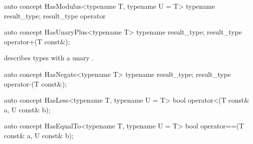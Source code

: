 \documentclass[american,twoside]{book}
\begin{document}
\begin{itemdescr}
\pnum
{}
\end{itemdescr}

\begin{itemdecl}
auto concept HasModulus<typename T, typename U = T> {
  typename result_type;
  result_type operator%
}
\end{itemdecl}

\begin{itemdescr}
\pnum
{}
\end{itemdescr}

\begin{itemdecl}
auto concept HasUnaryPlus<typename T> {
  typename result_type;
  result_type operator+(T const&);
}
\end{itemdecl}

\begin{itemdescr}
\pnum
\mbox{\reallynote} describes types with a unary \mbox{}.
\end{itemdescr}

\begin{itemdecl}
auto concept HasNegate<typename T> {
  typename result_type;
  result_type operator-(T const&);
}
\end{itemdecl}

\begin{itemdescr}
\pnum
{}
\end{itemdescr}

\begin{itemdecl}
auto concept HasLess<typename T, typename U = T> {
  bool operator<(T const& a, U const& b);
}
\end{itemdecl}

\begin{itemdescr}
\pnum
{}
\end{itemdescr}

\begin{itemdecl}
auto concept HasEqualTo<typename T, typename U = T> {
  bool operator==(T const& a, U const& b);
}
\end{itemdecl}

\begin{itemdescr}
\pnum
{}
\end{itemdescr}
\end{document}
